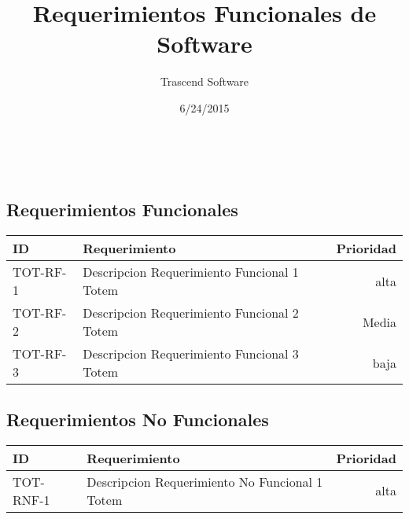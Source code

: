 \documentclass{article}
\title{Requerimientos Funcionales de Software}
\date
{
6/24/2015
}
\author{
Trascend Software
}
\begin{document}


\maketitle %
\newpage %
\
\begin{center}
	\section*{Requerimientos Funcionales}
\begin{tabular}{| l | p{7cm} | r |}
\hline
\bf ID & \bf Requerimiento & \bf Prioridad \\
\hline
TOT-RF-1&Descripcion Requerimiento Funcional 1 Totem&alta \\
\hline
TOT-RF-2&Descripcion Requerimiento Funcional 2 Totem&Media \\
\hline
TOT-RF-3&Descripcion Requerimiento Funcional 3 Totem&baja \\
\hline
\end{tabular}
\end{center}

\newpage
\begin{center}
	\section*{Requerimientos No Funcionales}
\begin{tabular}{| l | p{7cm} | r |}
\hline
\bf ID & \bf Requerimiento & \bf Prioridad \\
\hline
TOT-RNF-1&Descripcion Requerimiento No Funcional 1 Totem&alta \\
\hline
\end{tabular}
\end{center}
\end{document}
